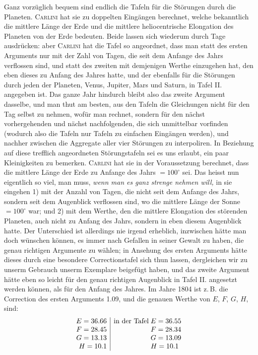 Ganz vorzüglich bequem sind endlich die Tafeln für die Störungen durch die Planeten. \textsc{Carlini} hat sie zu doppelten Eingängen berechnet, welche bekanntlich die mittlere Länge der Erde und die mittlere heliocentrische Elongation des Planeten von der Erde bedeuten. Beide lassen sich wiederum durch Tage ausdrücken: aber \textsc{Carlini} hat die Tafel so angeordnet, dass man statt des ersten Arguments nur mit der Zahl von Tagen, die seit dem Anfange des Jahrs verflossen sind, und statt des zweiten mit demjenigen Werthe einzugehen hat, den eben dieses zu Anfang des Jahres hatte, und der ebenfalls für die Störungen durch jeden der Planeten, Venus, Jupiter, Mars und Saturn, in Tafel II. angegeben ist. Das ganze Jahr hindurch bleibt also das zweite Argument dasselbe, und man thut am besten, aus den Tafeln die Gleichungen nicht für den Tag selbst zu nehmen, wofür man rechnet, sondern für den nächst vorhergehenden und nächst nachfolgenden, die sich unmittelbar vorfinden (wodurch also die Tafeln nur Tafeln zu einfachen Eingängen werden), und nachher zwischen die Aggregate aller vier Störungen zu interpoliren. In Beziehung auf diese trefflich angeordneten Störungstafeln sei es uns erlaubt, ein paar Kleinigkeiten zu bemerken. \textsc{Carlini} hat sie in der Voraussetzung berechnet, dass die mittlere Länge der Erde zu Anfange des Jahrs $= 100^\circ$ sei. Das heisst nun eigentlich so viel, man muss, \emph{wenn man es ganz strenge nehmen will,} in sie eingehen 1) mit der Anzahl von Tagen, die nicht seit dem Anfange des Jahrs, sondern seit dem Augenblick verflossen sind, wo die mittlere Länge der Sonne $= 100^\circ$ war; und 2) mit dem Werthe, den die mittlere Elongation des störenden Planeten, auch nicht zu Anfang des Jahrs, sondern in eben diesem Augenblick hatte. Der Unterschied ist allerdings nie irgend erheblich, inzwischen hätte man doch wünschen können, es immer nach Gefallen in seiner Gewalt zu haben, die genau richtigen Argumente zu wählen; in Ansehung des ersten Arguments hätte dieses durch eine besondere Correctionstafel sich thun lassen, dergleichen wir zu unserm Gebrauch unserm Exemplare beigefügt haben, und das zweite Argument hätte eben so leicht für den genau richtigen Augenblick in Tafel II. angesetzt werden können, als für den Anfang des Jahres. Im Jahre 1804 ist z.\,B. die Correction des ersten Arguments 1.09, und die genauen Werthe von $E$, $F$, $G$, $H$, sind: \[ \begin{array}{r|l@{\;}l} E = 36.66 & \text{in der Tafel} & E = 36.55\\ F = 28.45 & & F = 28.34\\ G = 13.13 & & G = 13.09\\ H = 10.1 & & H = 10.1 \end{array} \]

